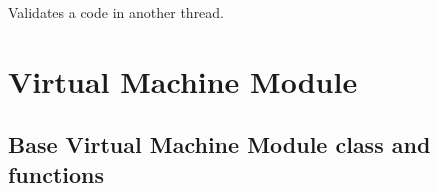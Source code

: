 \documentclass[letterpaper,10pt,english]{sphinxmanual}
\begin{document}
\begin{fulllineitems}
\begin{fulllineitems}
\end{fulllineitems}


\begin{fulllineitems}
\label{sysmod:pyfrid.modules.system.app.BaseApplicationModule.validate_code}
Validates a code in another thread.

\end{fulllineitems}


\end{fulllineitems}



\section{Virtual Machine Module}
\label{sysmod:virtual-machine-module}

\subsection{Base Virtual Machine Module class and functions}
\label{sysmod:base-virtual-machine-module-class-and-functions}\label{sysmod:module-pyfrid.modules.system.vm.core.vm}
\end{document}
